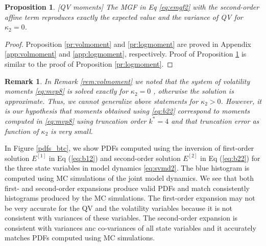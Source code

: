 \documentclass[pdftex,11pt,a4paper] {article}
\newtheorem{proposition}{Proposition}[section]
\newtheorem*{remark}{Remark}%
\begin{document}
\begin{proposition}\label{pr:qvarmoment} [QV moments] The MGF in Eq \eqref{eq:emgf2} with the second-order affine term  reproduces exactly the expected value and the variance of QV for $\kappa_{2}=0$.
\end{proposition}

\begin{proof}
Proposition \ref{pr:volmoment} and \ref{pr:logmoment} are proved in Appendix \ref{app:volmoment} and \ref{app:logmoment}, respectively. Proof of Proposition \ref{pr:qvarmoment}  is similar to the proof of Proposition \ref{pr:logmoment}. 
\end{proof}

\begin{remark}\label{rem:volmoment2}
In Remark \ref{rem:volmoment} we noted that the system of volatility moments \eqref{eq:mvp8} is solved exactly for $\kappa_{2}=0$ , otherwise the solution is approximate. Thus, we cannot generalize above statements for $\kappa_{2}>0$. However, it is our hypothesis that moments obtained using \eqref{eq:b22} correspond to moments computed in \eqref{eq:mvp8} using truncation order $k^{*}=4$ and that truncation error as function of $\kappa_{2}$ is very small. 
\end{remark}


In Figure \ref{pdfs_btc}, we show PDFs computed using the inversion of first-order solution $E^{[1]}$ in Eq (\ref{eq:b12}) and second-order solution $E^{[2]}$ in Eq (\ref{eq:b22}) for the three state variables in model dynamics \eqref{eq:svmd2}. The blue histogram is computed using MC simulations of the joint model dynamics. We see that both first- and second-order expansions produce valid PDFs and match consistently histograms produced by the MC simulations. The first-order expansion may not be very accurate for the QV and the volatility variables because it is not consistent with variances of these variables. The second-order expansion is consistent with variances anc co-variances of all state variables and it accurately matches PDFs computed using MC simulations.
\end{document}
